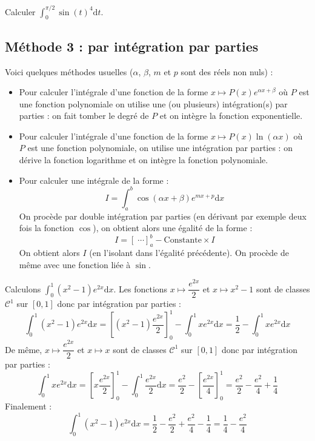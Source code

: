 \documentclass[french,11pt,twoside]{VcCours}
\newcommand{\dx}{\text{d}x}
\newcommand{\dt}{\text{d}t}
\newcommand{\Int}[2]{\int_{#1}^{#2}}
\begin{document}
\begin{ApplicationDirecte}{}
Calculer $\int_{0}^{\pi/2} \sin(t)^4 \dt$.
\end{ApplicationDirecte}

\subsection{Méthode 3 : par intégration par parties}

Voici quelques méthodes usuelles ($\alpha$, $\beta$, $m$ et $p$ sont des réels non nuls) :

\medskip

\begin{itemize}
\item Pour calculer l'intégrale d'une fonction de la forme $x \mapsto P(x)e^{\alpha x + \beta}$ où $P$ est une fonction polynomiale on utilise une (ou plusieurs) intégration(s) par parties : on fait tomber le degré de $P$ et on intègre la fonction exponentielle.
\item Pour calculer l'intégrale d'une fonction de la forme $x \mapsto P(x) \ln(\alpha x)$ où $P$ est une fonction polynomiale, on utilise une intégration par parties : on dérive la fonction logarithme et on intègre la fonction polynomiale.
\item Pour calculer une intégrale de la forme :
$$ I=\int_{a}^b \cos(\alpha x + \beta) e^{mx+p} \dx$$
On procède par double intégration par parties (en dérivant par exemple deux fois la fonction $\cos$), on obtient alors une égalité de la forme :
$$ I = \left[ \; \cdots \right]_{a}^b - \textrm{Constante} \times I$$
On obtient alors $I$ (en l'isolant dans l'égalité précédente). On procède de même avec une fonction liée à $\sin$.
\end{itemize}

\medskip

\begin{Exemple} Calculons $\Int{0}{1} (x^2-1) e^{2x} \dx$. Les fonctions $x \mapsto \dfrac{e^{2x}}{2}$ et $x \mapsto x^2-1$ sont de classes $\mathcal{C}^1$ sur $[0,1]$ donc par intégration par parties :
$$  \int_{0}^{1} (x^2-1) e^{2x} \dx = \left[ \left(x^2-1 \right) \dfrac{e^{2x}}{2} \right]_0^1 - \int_{0}^1 x e^{2x} \dx = \frac{1}{2} -  \int_{0}^1 x e^{2x} \dx $$
De même, $x \mapsto \dfrac{e^{2x}}{2}$ et $x \mapsto x$ sont de classes $\mathcal{C}^1$ sur $[0,1]$ donc par intégration par parties :
$$ \int_{0}^1 x e^{2x} \dx = \left[ x \dfrac{e^{2x}}{2} \right]_0^1 - \int_{0}^1 \dfrac{e^{2x}}{2}\dx = \frac{e^2}{2} - \left[ \frac{e^{2x}}{4} \right]_0^1 = \frac{e^2}{2} - \frac{e^2}{4} + \frac{1}{4}$$
Finalement :
$$ \int_{0}^{1} (x^2-1) e^{2x} \dx = \frac{1}{2} - \frac{e^2}{2} + \frac{e^2}{4} - \frac{1}{4} = \frac{1}{4} - \frac{e^2}{4}$$
\end{Exemple}
\end{document}
